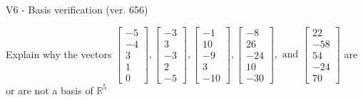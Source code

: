 \begin{exercise}
  \begin{exerciseTitle}V6 - Basis verification (ver. 656)\end{exerciseTitle}
  \begin{exerciseStatement}
    Explain why the vectors \(\left[\begin{array}{r}
-5 \\
-4 \\
3 \\
1 \\
0
\end{array}\right] , \left[\begin{array}{r}
-3 \\
3 \\
-3 \\
2 \\
-5
\end{array}\right] , \left[\begin{array}{r}
-1 \\
10 \\
-9 \\
3 \\
-10
\end{array}\right] , \left[\begin{array}{r}
-8 \\
26 \\
-24 \\
10 \\
-30
\end{array}\right] , \text{ and } \left[\begin{array}{r}
22 \\
-58 \\
54 \\
-24 \\
70
\end{array}\right]\) are or are not a basis of \(\mathbb{R}^5\)	



\end{exerciseStatement}
\end{exercise}
